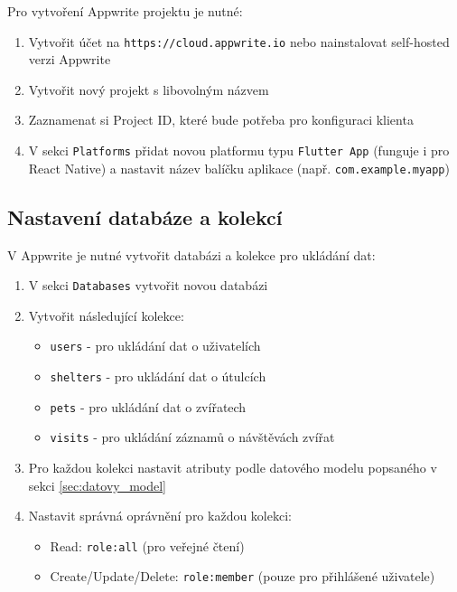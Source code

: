 \documentclass[czech, bp, kiv, he, iso690numb, pdf]{fasthesis}
\begin{document}
    Pro vytvoření Appwrite projektu je nutné:

    \begin{enumerate}
        \item Vytvořit účet na \texttt{https://cloud.appwrite.io} nebo nainstalovat self-hosted verzi Appwrite
        \item Vytvořit nový projekt s libovolným názvem
        \item Zaznamenat si Project ID, které bude potřeba pro konfiguraci klienta
        \item V sekci \texttt{Platforms} přidat novou platformu typu \texttt{Flutter App} (funguje i pro React Native) a nastavit název balíčku aplikace (např. \texttt{com.example.myapp})
    \end{enumerate}

    \subsection{Nastavení databáze a kolekcí}
    \label{subsec:database-collections}

    V Appwrite je nutné vytvořit databázi a kolekce pro ukládání dat:

    \begin{enumerate}
        \item V sekci \texttt{Databases} vytvořit novou databázi
        \item Vytvořit následující kolekce:
        \begin{itemize}
            \item \texttt{users} - pro ukládání dat o uživatelích
            \item \texttt{shelters} - pro ukládání dat o útulcích
            \item \texttt{pets} - pro ukládání dat o zvířatech
            \item \texttt{visits} - pro ukládání záznamů o návštěvách zvířat
        \end{itemize}
        \item Pro každou kolekci nastavit atributy podle datového modelu popsaného v sekci \ref{sec:datovy_model}
        \item Nastavit správná oprávnění pro každou kolekci:
        \begin{itemize}
            \item Read: \texttt{role:all} (pro veřejné čtení)
            \item Create/Update/Delete: \texttt{role:member} (pouze pro přihlášené uživatele)
        \end{itemize}
    \end{enumerate}
\end{document}
